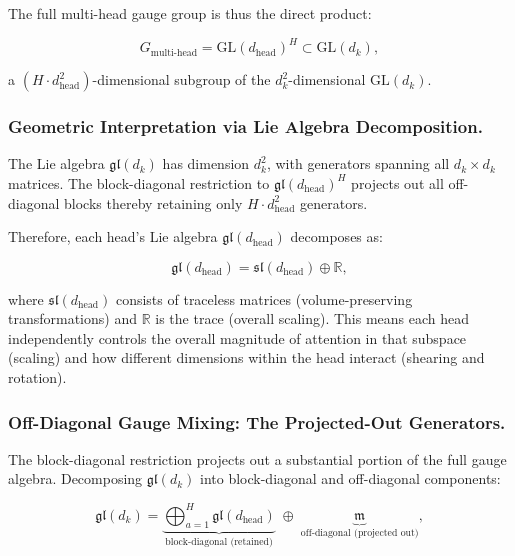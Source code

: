 \documentclass[twoside,11pt]{article}
\begin{document}
The full multi-head gauge group is thus the direct product:

\begin{equation}
G_{\text{multi-head}} = \mathrm{GL}(d_{\text{head}})^H \subset \mathrm{GL}(d_k),
\end{equation}

a $(H \cdot d_{\text{head}}^2)$-dimensional subgroup of the $d_k^2$-dimensional $\mathrm{GL}(d_k)$.

\subsubsection{Geometric Interpretation via Lie Algebra Decomposition.}

The Lie algebra $\mathfrak{gl}(d_k)$ has dimension $d_k^2$, with generators spanning all $d_k \times d_k$ matrices. The block-diagonal restriction to $\mathfrak{gl}(d_{\text{head}})^H$ projects out all off-diagonal blocks thereby retaining only $H \cdot d_{\text{head}}^2$ generators.

Therefore, each head's Lie algebra $\mathfrak{gl}(d_{\text{head}})$ decomposes as:

\begin{equation}
\mathfrak{gl}(d_{\text{head}}) = \mathfrak{sl}(d_{\text{head}}) \oplus \mathbb{R},
\end{equation}

where $\mathfrak{sl}(d_{\text{head}})$ consists of traceless matrices (volume-preserving transformations) and $\mathbb{R}$ is the trace (overall scaling). This means each head independently controls the overall magnitude of attention in that subspace (scaling) and how different dimensions within the head interact (shearing and rotation).

\subsubsection{Off-Diagonal Gauge Mixing: The Projected-Out Generators.}
\label{sec:off_diagonal_mixing}

The block-diagonal restriction projects out a substantial portion of the full gauge algebra. Decomposing $\mathfrak{gl}(d_k)$ into block-diagonal and off-diagonal components:

\begin{equation}
\mathfrak{gl}(d_k) = \underbrace{\bigoplus_{a=1}^{H} \mathfrak{gl}(d_{\text{head}})}_{\text{block-diagonal (retained)}} \;\oplus\; \underbrace{\mathfrak{m}}_{\text{off-diagonal (projected out)}},
\label{eq:lie_algebra_decomposition}
\end{equation}
\end{document}

